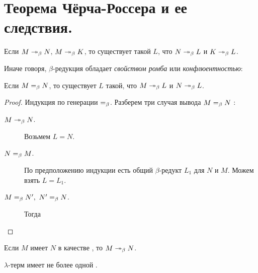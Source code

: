 \documentclass[11pt,a4paper]{article}
\begin{document}
\section{Теорема Чёрча-Россера и ее следствия.}
\begin{thm}
	Если $ M \twoheadrightarrow_{\beta} N$, $ M \twoheadrightarrow_{\beta} K$, то существует такой $ L$, что
	$N \twoheadrightarrow_{\beta} L$ и $ K \twoheadrightarrow_{\beta} L$.
\end{thm}
Иначе говоря, $ \beta $-редукция обладает \textit{свойством ромба} или \textit{конфлюентностью}:

\begin{center}
\end{center}
\begin{cor}
    Если $ M =_{\beta} N$, то существует $ L$ такой, что $ M \twoheadrightarrow_{\beta} L$ и $ N \twoheadrightarrow_{\beta} L$.
\end{cor}
\begin{proof}
   Индукция по генерации $ =_{\beta}$. 
   Разберем три случая вывода $ M =_{\beta} N$ :
   \begin{description}
	   \item[$ M \twoheadrightarrow_{\beta} N$.] Возьмем $ L = N$. 
	   \item[$ N =_{\beta} M$.] По предположению индукции есть общий  $ \beta$-редукт $ L_1$ для $ N$ и $ M$. Можем взять $ L = L_1$.
	   \item[$ M =_{\beta} N', ~ N' =_{\beta} N$.]  Тогда
\begin{center}
\end{center}
   \end{description}
\end{proof}
\begin{cor}
    Если $ M$ имеет $ N$ в качестве \bNF, то  $ M \twoheadrightarrow_{\beta} N$.
\end{cor}
\begin{cor}
    $ \lambda$-терм имеет не более одной \bNF.
\end{cor}
\end{document}
